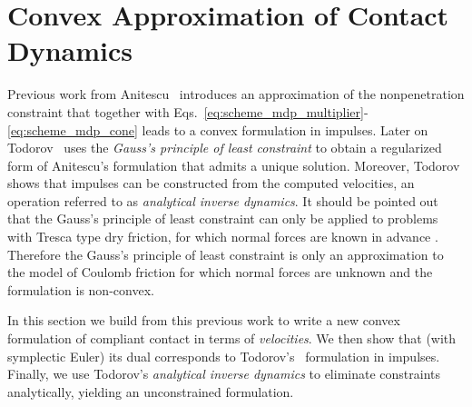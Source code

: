 
\section{Convex Approximation of Contact Dynamics}\label{sec:convex_approximation}

Previous work from Anitescu~\cite{bib:anitescu2006} introduces an approximation
of the nonpenetration constraint that together with
Eqs.~\eqref{eq:scheme_mdp_multiplier}-\eqref{eq:scheme_mdp_cone} leads to a
convex formulation in impulses. Later on Todorov~\cite{bib:todorov2011,
bib:todorov2014} uses the \emph{Gauss's principle of least constraint} to obtain
a regularized form of Anitescu's formulation that admits a unique solution.
Moreover, Todorov shows that impulses can be constructed from the computed
velocities, an operation referred to as \textit{analytical inverse dynamics}. It
should be pointed out that the Gauss's principle of least constraint can only be
applied to problems with Tresca type dry friction, for which normal forces are
known in advance \cite{bib:yunt2014}. Therefore the Gauss's principle of least
constraint is only an approximation to the model of Coulomb friction for which
normal forces are unknown and the formulation is non-convex.

In this section we build from this previous work to write a new convex formulation
of compliant contact in terms of \emph{velocities}.  We then show that (with
symplectic Euler) its dual corresponds to Todorov's~\cite{bib:todorov2014}
formulation in impulses. Finally, we use
Todorov's \textit{analytical inverse dynamics} to eliminate constraints
analytically, yielding an unconstrained formulation.




